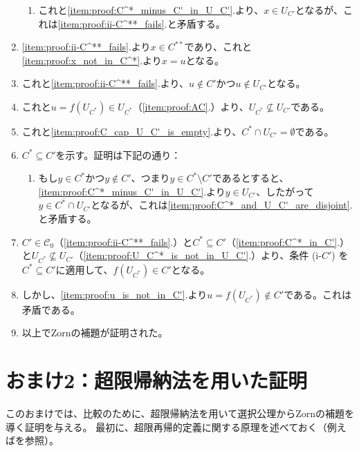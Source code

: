 ﻿\documentclass{ltjsarticle}
\theoremstyle{definition}
\begin{document}
\begin{enumerate}
\begin{enumerate}
        \item これと\ref{item:proof:C^*_minus_C'_in_U_C'}.より、$x \in U_{C'}$となるが、これは\ref{item:proof:ii-C^**_fails}.と矛盾する。
    \end{enumerate}
    \item \ref{item:proof:ii-C^**_fails}.より$x \in C^{**}$であり、これと\ref{item:proof:x_not_in_C^*}.より$x = u$となる。
    \item \label{item:proof:u_is_not_in_C'} これと\ref{item:proof:ii-C^**_fails}.より、$u \not\in C'$かつ$u \not\in U_{C'}$となる。
    \item \label{item:proof:U_C^*_is_not_in_U_C'} これと$u = f(U_{C^*}) \in U_{C^*}$（\ref{item:proof:AC}.）より、$U_{C^*} \not\subseteq U_{C'}$である。
    \item \label{item:proof:C^*_and_U_C'_are_disjoint} これと\ref{item:proof:C_cap_U_C'_is_empty}.より、$C^* \cap U_{C'} = \emptyset$である。
    \item \label{item:proof:C^*_in_C'} $C^* \subseteq C'$を示す。証明は下記の通り：
    \begin{enumerate}
        \item もし$y \in C^*$かつ$y \not\in C'$、つまり$y \in C^* \setminus C'$であるとすると、\ref{item:proof:C^*_minus_C'_in_U_C'}.より$y \in U_{C'}$、したがって$y \in C^* \cap U_{C'}$となるが、これは\ref{item:proof:C^*_and_U_C'_are_disjoint}.と矛盾する。
    \end{enumerate}
    \item $C' \in \mathcal{C}_0$（\ref{item:proof:ii-C^**_fails}.）と$C^* \subseteq C'$（\ref{item:proof:C^*_in_C'}.）と$U_{C^*} \not\subseteq U_{C'}$（\ref{item:proof:U_C^*_is_not_in_U_C'}.）より、条件 (i-$C'$) を$C^* \subseteq C'$に適用して、$f(U_{C^*}) \in C'$となる。
    \item しかし、\ref{item:proof:u_is_not_in_C'}.より$u = f(U_{C^*}) \not\in C'$である。これは矛盾である。
    \item 以上でZornの補題が証明された。
\end{enumerate}



\section*{おまけ2：超限帰納法を用いた証明}

このおまけでは、比較のために、超限帰納法を用いて選択公理からZornの補題を導く証明を与える。
最初に、超限再帰的定義に関する原理を述べておく（例えば\cite[第I章定理9.3]{Kunen}を参照）。
\end{document}

